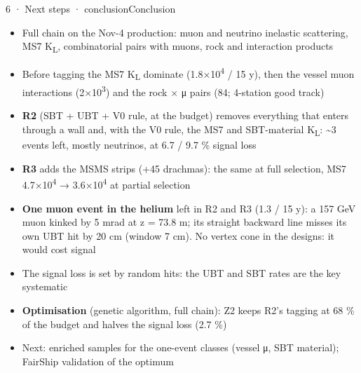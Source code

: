 \begin{btframe}{6 · Next steps · conclusion}{Conclusion}
{\fontsize{6.15pt}{8.60pt}\selectfont
\begin{itemize}
  \item Full chain on the Nov-4 production: muon and neutrino inelastic scattering, MS7 K\textsubscript{L}, combinatorial pairs with muons, rock and interaction products
  \item Before tagging the MS7 K\textsubscript{L} dominate (1.8×10\textsuperscript{4} / 15 y), then the vessel muon interactions (2×10\textsuperscript{3}) and the rock × μ pairs (84; 4-station good track)
  \item \textbf{R2} (SBT + UBT + V0 rule, at the budget) removes everything that enters through a wall and, with the V0 rule, the MS7 and SBT-material K\textsubscript{L}: \textasciitilde{}3 events left, mostly neutrinos, at 6.7 / 9.7 \% signal loss
  \item \textbf{R3} adds the MSMS strips (+45 drachmas): the same at full selection, MS7 4.7×10\textsuperscript{4} → 3.6×10\textsuperscript{4} at partial selection
  \item \textbf{One muon event in the helium} left in R2 and R3 (1.3 / 15 y): a 157 GeV muon kinked by 5 mrad at z = 73.8 m; its straight backward line misses its own UBT hit by 20 cm (window 7 cm). No vertex cone in the designs: it would cost signal
  \item The signal loss is set by random hits: the UBT and SBT rates are the key systematic
  \item \textbf{Optimisation} (genetic algorithm, full chain): Z2 keeps R2's tagging at 68 \% of the budget and halves the signal loss (2.7 \%)
  \item Next: enriched samples for the one-event classes (vessel μ, SBT material); FairShip validation of the optimum
\end{itemize}}
\end{btframe}
